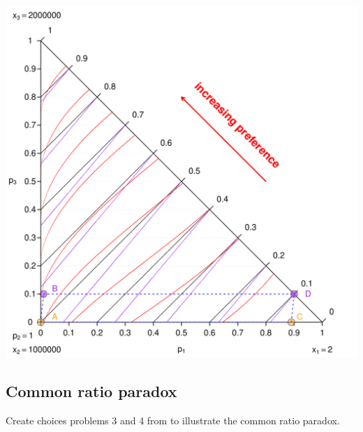 \documentclass{article}\usepackage[]{graphicx}\usepackage[]{color}
\newenvironment{knitrout}{}{} %
\begin{document}
\begin{knitrout}
{\centering \includegraphics[width=0.8\linewidth]{figure/unnamed-chunk-11} 

}



\end{knitrout}


\subsection{Common ratio paradox}

Create choices problems 3 and 4 from \citet[][p. 266]{Kahneman_Tversky_1979} to illustrate the common ratio paradox.
\end{document}
